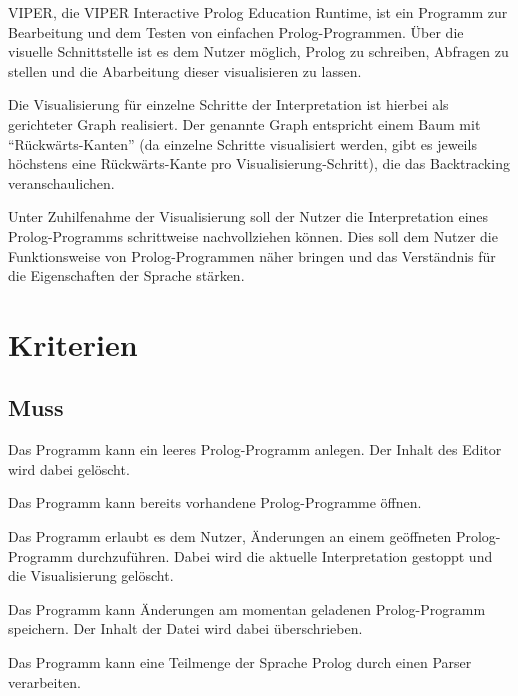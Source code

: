 \documentclass[parskip=full,11pt,twoside]{scrartcl}
\begin{document}
VIPER, die VIPER Interactive Prolog Education Runtime, ist ein Programm zur Bearbeitung und dem Testen von einfachen Prolog-Programmen. Über die visuelle Schnittstelle ist es dem Nutzer möglich, Prolog zu schreiben, Abfragen zu stellen und die Abarbeitung dieser visualisieren zu lassen.

Die Visualisierung für einzelne Schritte der Interpretation ist hierbei als gerichteter Graph realisiert. Der genannte Graph entspricht einem Baum mit \enquote{Rückwärts-Kanten} (da einzelne Schritte visualisiert werden, gibt es jeweils höchstens eine Rückwärts-Kante pro Visualisierung-Schritt), die das Backtracking veranschaulichen.

Unter Zuhilfenahme der Visualisierung soll der Nutzer die Interpretation eines Prolog-Programms schrittweise nachvollziehen können. Dies soll dem Nutzer die Funktionsweise von Prolog-Programmen näher bringen und das Verständnis für die Eigenschaften der Sprache stärken.

\section{Kriterien}

\subsection{Muss}


Das Programm kann ein leeres Prolog-Programm anlegen. Der Inhalt des Editor wird dabei gelöscht.


Das Programm kann bereits vorhandene Prolog-Programme öffnen.


Das Programm erlaubt es dem Nutzer, Änderungen an einem geöffneten Prolog-Programm durchzuführen. Dabei wird die aktuelle Interpretation gestoppt und die Visualisierung gelöscht.


Das Programm kann Änderungen am momentan geladenen Prolog-Programm speichern. Der Inhalt der Datei wird dabei überschrieben.


Das Programm kann eine Teilmenge der Sprache Prolog durch einen Parser verarbeiten.
\end{document}
